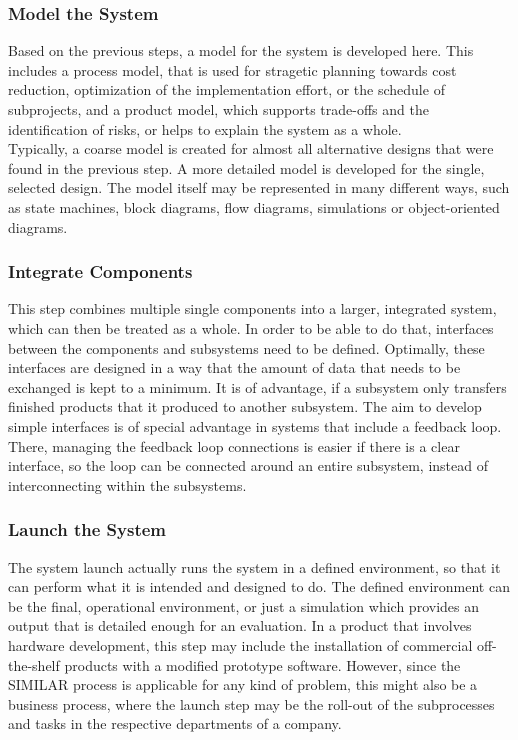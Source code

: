 \subsubsection{Model the System}

Based on the previous steps, a model for the system is developed here.
This includes a process model, that is used for stragetic planning towards cost reduction, optimization of the implementation effort, or the schedule of subprojects, and a product model, which supports trade-offs and the identification of risks, or helps to explain the system as a whole.\\

Typically, a coarse model is created for almost all alternative designs that were found in the previous step.
A more detailed model is developed for the single, selected design.
The model itself may be represented in many different ways, such as state machines, block diagrams, flow diagrams, simulations or object-oriented diagrams.

\subsubsection{Integrate Components}

This step combines multiple single components into a larger, integrated system, which can then be treated as a whole.
In order to be able to do that, interfaces between the components and subsystems need to be defined.
Optimally, these interfaces are designed in a way that the amount of data that needs to be exchanged is kept to a minimum.
It is of advantage, if a subsystem only transfers finished products that it produced to another subsystem.
The aim to develop simple interfaces is of special advantage in systems that include a feedback loop.
There, managing the feedback loop connections is easier if there is a clear interface, so the loop can be connected around an entire subsystem, instead of interconnecting within the subsystems.

\subsubsection{Launch the System}

The system launch actually runs the system in a defined environment, so that it can perform what it is intended and designed to do.
The defined environment can be the final, operational environment, or just a simulation which provides an output that is detailed enough for an evaluation.
In a product that involves hardware development, this step may include the installation of commercial off-the-shelf products with a modified prototype software.
However, since the SIMILAR process is applicable for any kind of problem, this might also be a business process, where the launch step may be the roll-out of the subprocesses and tasks in the respective departments of a company.


